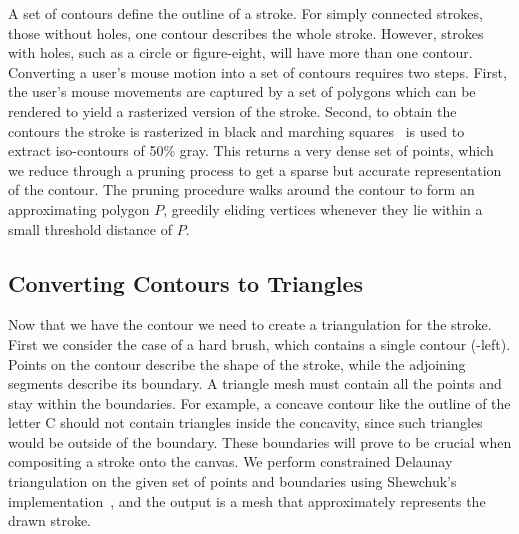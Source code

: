 \documentclass[review]{acmsiggraph}
\begin{document}
A set of contours define the outline of a stroke. For simply connected strokes, those without holes, 
one contour describes the whole stroke. However, strokes with holes, such as a circle or 
figure-eight, will have more than one contour.
Converting a user's mouse motion into a set of contours requires two steps.
First, the user's mouse movements are captured by a set of polygons which can be
rendered to yield a rasterized version of the stroke.
Second, to obtain the contours the stroke is rasterized in black and marching squares~\cite{lorensen1987}
is used to extract iso-contours of 50\% gray. This returns a very dense set of points,
which we reduce through a pruning process to
get a sparse but accurate representation of the contour.
The pruning procedure walks around the contour to form an approximating polygon $P$,
greedily eliding vertices whenever they lie within a small threshold distance of $P$.



\subsection{Converting Contours to Triangles}
\label{sec:contours}

Now that we have the contour we need to create a triangulation for the stroke. 
First we consider the case of a hard brush, which contains a single contour (-left).
Points on the contour describe the shape of the stroke, while the adjoining segments
describe its boundary.
A triangle mesh must contain all the points and stay
within the boundaries. 
For example, a concave contour like the outline of the letter C should not contain 
triangles inside the concavity, since such triangles would be outside of the boundary.
These boundaries will prove to be crucial when compositing a stroke onto the canvas.
%
We perform constrained Delaunay triangulation on the given set of points and boundaries using
Shewchuk's implementation~, and the output is a mesh that
approximately represents the drawn stroke.
\end{document}

